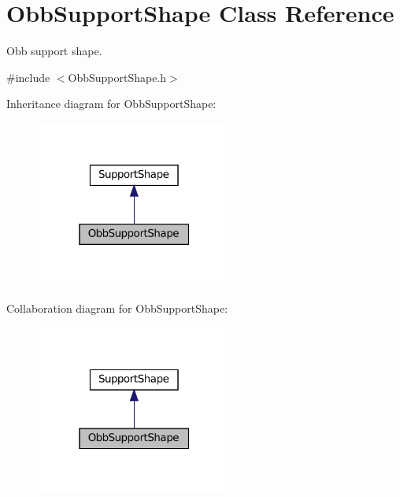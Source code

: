 \hypertarget{classObbSupportShape}{}\section{Obb\+Support\+Shape Class Reference}
\label{classObbSupportShape}


Obb support shape.  




{\ttfamily \#include $<$Obb\+Support\+Shape.\+h$>$}



Inheritance diagram for Obb\+Support\+Shape\+:
\nopagebreak
\begin{figure}[H]
\begin{center}
\leavevmode
\includegraphics[width=184pt]{classObbSupportShape__inherit__graph}
\end{center}
\end{figure}


Collaboration diagram for Obb\+Support\+Shape\+:
\nopagebreak
\begin{figure}[H]
\begin{center}
\leavevmode
\includegraphics[width=184pt]{classObbSupportShape__coll__graph}
\end{center}
\end{figure}
